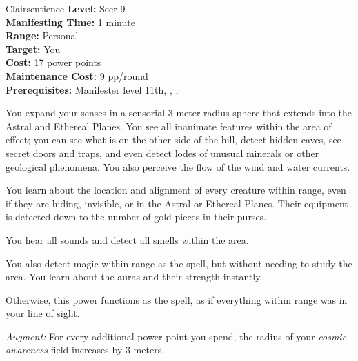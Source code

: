 {Clairsentience}
{
	\textbf{Level:}
	Seer 9\\
	\textbf{Manifesting Time:}
	1 minute\\
	\textbf{Range:}
	Personal\\
	\textbf{Target:}
	You\\
	\textbf{Cost:}
	17 power points\\
	\textbf{Maintenance Cost:}
	9 pp/round\\
	\textbf{Prerequisites:}
	Manifester level 11th, , , \\
}
{
	You expand your senses in a sensorial 3-meter-radius sphere that extends into the Astral and Ethereal Planes. You see all inanimate features within the area of effect; you can see what is on the other side of the hill, detect hidden caves, see secret doors and traps, and even detect lodes of unusual minerals or other geological phenomena. You also perceive the flow of the wind and water currents.

	You learn about the location and alignment of every creature within range, even if they are hiding, invisible, or in the Astral or Ethereal Planes. Their equipment is detected down to the number of gold pieces in their purses.

	You hear all sounds and detect all smells within the area.

	You also detect magic within range as the  spell, but without needing to study the area. You learn about the auras and their strength instantly.

	Otherwise, this power functions as the  spell, as if everything within range was in your line of sight.

	\textit{Augment:} For every additional power point you spend, the radius of your \emph{cosmic awareness} field increases by 3 meters.
}